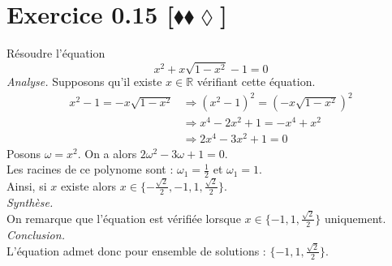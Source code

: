 \documentclass[10pt]{article}
\begin{document}
\section*{Exercice 0.15 [$\blacklozenge\blacklozenge\lozenge$]}
\begin{tcolorbox}[enhanced, width=7in, center, size=fbox, fontupper=\large, drop shadow southwest]
    Résoudre l'équation
    \begin{equation*}
        x^2 + x\sqrt{1-x^2}-1=0
    \end{equation*}
    \emph{Analyse.}
    Supposons qu'il existe $x\in\mathbb{R}$ vérifiant cette équation.
    \begin{align*}
        x^2-1=-x\sqrt{1-x^2} 
        &\Rightarrow (x^2-1)^2=(-x\sqrt{1-x^2})^2\\
        &\Rightarrow x^4 - 2x^2 + 1 = -x^4+x^2\\
        &\Rightarrow 2x^4-3x^2+1=0
    \end{align*}
    Posons $\omega=x^2$. On a alors $2\omega^2-3\omega+1=0$.\\
    Les racines de ce polynome sont : $\omega_1=\frac{1}{2}$ et $\omega_1=1$.\\
    Ainsi, si $x$ existe alors $x\in\{-\frac{\sqrt{2}}{2},-1,1,\frac{\sqrt{2}}{2}\}$.\\[0.25cm]
    \emph{Synthèse.}\\
    On remarque que l'équation est vérifiée lorsque $x\in\{-1,1,\frac{\sqrt{2}}{2}\}$ uniquement.\\[0.25cm]
    \emph{Conclusion.}\\
    L'équation admet donc pour ensemble de solutions : $\{-1,1,\frac{\sqrt{2}}{2}\}$.
\end{tcolorbox}
\end{document}
